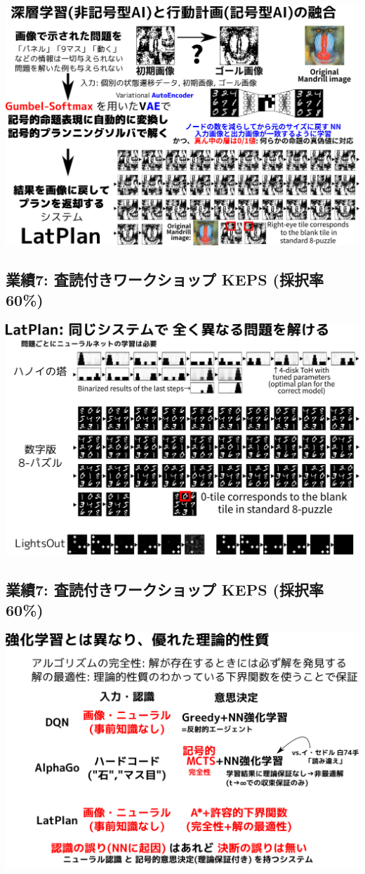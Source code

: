 \includegraphics{img/keps17.png}

\subsection{業績7: 査読付きワークショップ KEPS (採択率60\%)}
\label{sec:orgheadline40}

\includegraphics{img/keps17-2.png}

\subsection{業績7: 査読付きワークショップ KEPS (採択率60\%)}
\label{sec:orgheadline41}

\includegraphics{img/keps17-3.png}

